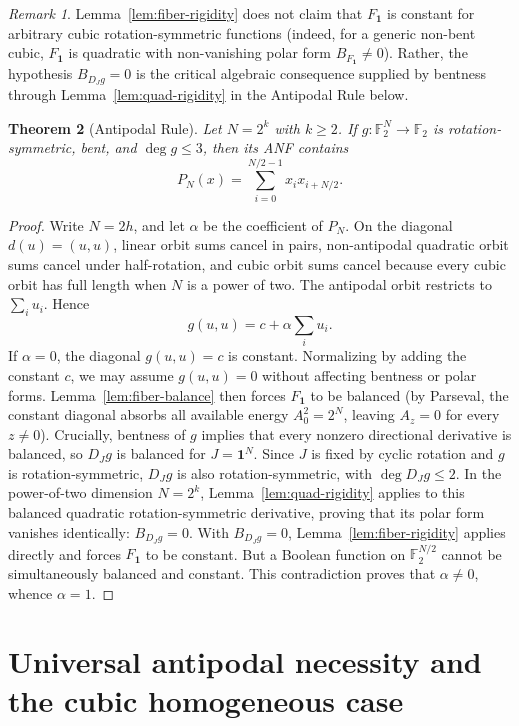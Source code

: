 \documentclass[11pt,a4paper]{article}
\newtheorem{theorem}{Theorem}[section]
\theoremstyle{remark}
\newtheorem{remark}[theorem]{Remark}
\theoremstyle{plain}
\newcommand{\F}{\mathbb F_2}
\begin{document}
\begin{remark}\label{rem:fiber-bent-role}
Lemma~\ref{lem:fiber-rigidity} does not claim that \(F_{\mathbf1}\) is constant for arbitrary cubic rotation-symmetric functions (indeed, for a generic non-bent cubic, \(F_{\mathbf1}\) is quadratic with non-vanishing polar form \(B_{F_{\mathbf1}}\ne0\)). Rather, the hypothesis \(B_{D_Jg}=0\) is the critical algebraic consequence supplied by bentness through Lemma~\ref{lem:quad-rigidity} in the Antipodal Rule below.
\end{remark}

\begin{theorem}[Antipodal Rule]\label{thm:antipodal}
Let \(N=2^k\) with \(k\ge2\). If \(g:\F^N\to\F\) is rotation-symmetric, bent, and \(\deg g\le3\), then its ANF contains
\[
P_N(x)=\sum_{i=0}^{N/2-1}x_i x_{i+N/2}.
\]
\end{theorem}
\begin{proof}
Write \(N=2h\), and let \(\alpha\) be the coefficient of \(P_N\). On the diagonal \(d(u)=(u,u)\), linear orbit sums cancel in pairs, non-antipodal quadratic orbit sums cancel under half-rotation, and cubic orbit sums cancel because every cubic orbit has full length when \(N\) is a power of two. The antipodal orbit restricts to \(\sum_i u_i\). Hence
\[
g(u,u)=c+\alpha\sum_i u_i.
\]
If \(\alpha=0\), the diagonal \(g(u,u)=c\) is constant. Normalizing by adding the constant \(c\), we may assume \(g(u,u)=0\) without affecting bentness or polar forms. Lemma~\ref{lem:fiber-balance} then forces \(F_{\mathbf1}\) to be balanced (by Parseval, the constant diagonal absorbs all available energy \(A_0^2 = 2^N\), leaving \(A_z = 0\) for every \(z\ne0\)). Crucially, bentness of \(g\) implies that every nonzero directional derivative is balanced, so \(D_Jg\) is balanced for \(J=\mathbf1^N\). Since \(J\) is fixed by cyclic rotation and \(g\) is rotation-symmetric, \(D_Jg\) is also rotation-symmetric, with \(\deg D_Jg\le2\). In the power-of-two dimension \(N=2^k\), Lemma~\ref{lem:quad-rigidity} applies to this balanced quadratic rotation-symmetric derivative, proving that its polar form vanishes identically: \(B_{D_Jg}=0\). With \(B_{D_Jg}=0\), Lemma~\ref{lem:fiber-rigidity} applies directly and forces \(F_{\mathbf1}\) to be constant. But a Boolean function on \(\F^{N/2}\) cannot be simultaneously balanced and constant. This contradiction proves that \(\alpha\ne0\), whence \(\alpha=1\).
\end{proof}

\section{Universal antipodal necessity and the cubic homogeneous case}
\end{document}
